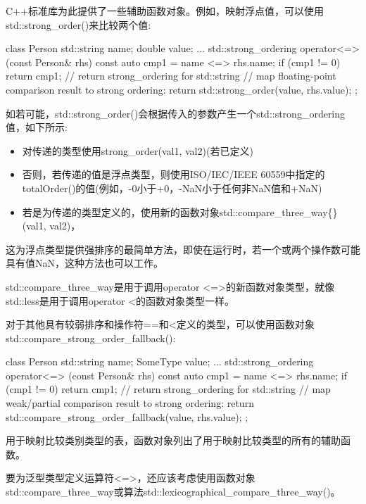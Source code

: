 C++标准库为此提供了一些辅助函数对象。例如，映射浮点值，可以使用std::strong\_order()来比较两个值:

\begin{cpp}
class Person {
	std::string name;
	double value;
	...
	std::strong_ordering operator<=> (const Person& rhs) const {
		auto cmp1 = name <=> rhs.name;
		if (cmp1 != 0) return cmp1; // return strong_ordering for std::string
		// map floating-point comparison result to strong ordering:
		return std::strong_order(value, rhs.value);
	}
};
\end{cpp}

如若可能，std::strong\_order()会根据传入的参数产生一个std::strong\_ordering值，如下所示:

\begin{itemize}
\item
对传递的类型使用strong\_order(val1, val2)(若已定义)

\item
否则，若传递的值是浮点类型，则使用ISO/IEC/IEEE 60559中指定的totalOrder()的值(例如，-0小于+0，-NaN小于任何非NaN值和+NaN)

\item
若是为传递的类型定义的，使用新的函数对象std::compare\_three\_way\{\}(val1, val2)，
\end{itemize}

这为浮点类型提供强排序的最简单方法，即使在运行时，若一个或两个操作数可能具有值NaN，这种方法也可以工作。

std::compare\_three\_way是用于调用operator <=>的新函数对象类型，就像std::less是用于调用operator <的函数对象类型一样。

对于其他具有较弱排序和操作符==和<定义的类型，可以使用函数对象std::compare\_strong\_order\_fallback():

\begin{cpp}
class Person {
	std::string name;
	SomeType value;
	...
	std::strong_ordering operator<=> (const Person& rhs) const {
		auto cmp1 = name <=> rhs.name;
		if (cmp1 != 0) return cmp1; // return strong_ordering for std::string
		// map weak/partial comparison result to strong ordering:
		return std::compare_strong_order_fallback(value, rhs.value);
	}
};
\end{cpp}

用于映射比较类别类型的表，函数对象列出了用于映射比较类型的所有的辅助函数。

要为泛型类型定义运算符<=>，还应该考虑使用函数对象std::compare\_three\_way或算法std::lexicographical\_compare\_three\_way()。
